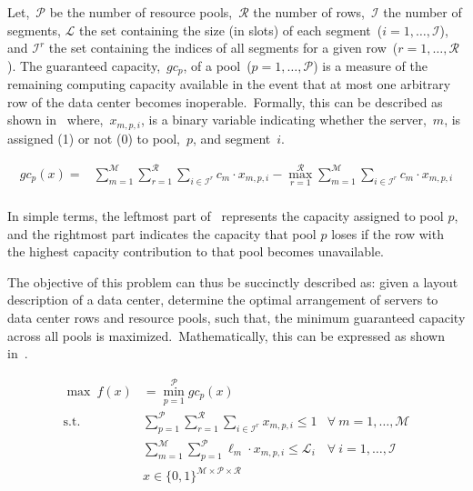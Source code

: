 Let,~$\mathcal{P}$ be the number of resource pools,~$\mathcal{R}$ the number of
rows,~$\mathcal{I}$ the number of segments, $\mathcal{L}$ the set containing the
size (in slots) of each segment~($i = 1, \ldots, \mathcal{I}$), and
$\mathcal{I}^{r}$ the set containing the indices of all segments for a given
row~($r = 1, \ldots, \mathcal{R}$). The guaranteed capacity,~$gc_{p}$, of a
pool~($p = 1, \ldots, \mathcal{P}$) is a measure of the remaining computing
capacity available in the event that at most one arbitrary row of the data
center becomes inoperable.~Formally, this can be described as shown
in~ where,~$x_{m,p,i}$, is a binary variable
indicating whether the server,~$m$, is assigned (1) or not (0) to pool,~$p$, and
segment~$i$.

\begin{equation}
  \label{eq:guaranteed-capacity}
  \begin{aligned}
    gc_p(x)     = & \sum_{m=1}^\mathcal{M} \sum_{r=1}^\mathcal{R} \sum_{i \in \mathcal{I}^{r}} c_m \cdot x_{m,p,i} - \max_{r=1}^\mathcal{R} \sum_{m=1}^\mathcal{M} \sum_{i \in \mathcal{I}^r} c_m \cdot x_{m,p,i} \\
  \end{aligned}
\end{equation}

In simple terms, the leftmost part of~ represents
the capacity assigned to pool $p$, and the rightmost part indicates the capacity
that pool $p$ loses if the row with the highest capacity contribution to that
pool becomes unavailable.

The objective of this problem can thus be succinctly described as: given a
layout description of a data center, determine the optimal arrangement of
servers to data center rows and resource pools, such that, the minimum
guaranteed capacity across all pools is maximized.~Mathematically, this can be
expressed as shown in~.

\begin{equation}
  \label{eq:objective}
  \begin{aligned}
    \max\ f(x)   & = \min_{p=1}^\mathcal{P}{gc_{p}(x)}                                                                                                \\
    \text{s.t. } & \sum_{p=1}^{\mathcal{P}} \sum_{r=1}^{\mathcal{R}} \sum_{i \in \mathcal{I}^{r}} x_{m,p,i} \le 1 & \forall\ m=1,\ldots,\mathcal{M}   \\
                 & \sum_{m=1}^{\mathcal{M}} \sum_{p=1}^{\mathcal{P}} \ell_m \cdot x_{m,p,i} \le \mathcal{L}_{i}   & \forall\  i=1,\ldots, \mathcal{I} \\
                 & x \in {\{0,1\}}^{\mathcal{M} \times \mathcal{P} \times \mathcal{R}}                                                                \\
  \end{aligned}
\end{equation}

